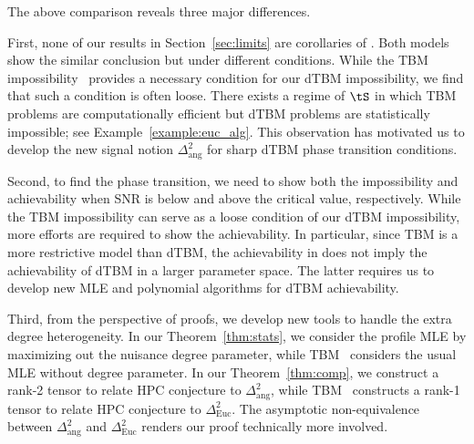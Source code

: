 \documentclass[lettersize,onecolumn,journal]{IEEEtran}
\theoremstyle{definition}
\theoremstyle{definition}
\begin{document}
{\begin{itemize}[wide]
The above comparison reveals three major differences. 

First, none of our results in Section~\ref{sec:limits} are corollaries of \cite{han2020exact}. Both models show the similar conclusion but under different conditions. While the TBM impossibility~\citep{han2020exact} provides a necessary condition for our dTBM impossibility, we find that such a condition is often loose. There exists a regime of $\tS$ in which TBM problems are computationally efficient but dTBM problems are statistically impossible; see Example~\ref{example:euc_alg}. This observation has motivated us to develop the new signal notion $\Delta^2_{\text{ang}}$ for sharp dTBM phase transition conditions.  
     
 Second, to find the phase transition, we need to show both the impossibility and achievability when SNR is below and above the critical value, respectively. While the TBM impossibility can serve as a loose condition of our dTBM impossibility, more efforts are required to show the achievability. In particular, since TBM is a more restrictive model than dTBM, the achievability in \cite{han2020exact} does not imply the achievability of dTBM in a larger parameter space. The latter requires us to develop new MLE and polynomial algorithms for dTBM achievability.  %
    
Third, from the perspective of proofs, we develop new tools to handle the extra degree heterogeneity. In our Theorem~\ref{thm:stats}, we consider the profile MLE by maximizing out the nuisance degree parameter, while TBM~\citep{han2020exact} considers the usual MLE without degree parameter. In our Theorem~\ref{thm:comp}, we construct a rank-2 tensor to relate HPC conjecture to $\Delta^2_{\text{ang}}$, while TBM~\citep{han2020exact} constructs a rank-1 tensor to relate HPC conjecture to $\Delta^2_{\text{Euc}}$. The asymptotic non-equivalence between $\Delta^2_{\text{ang}}$ and $\Delta^2_{\text{Euc}}$ renders our proof technically more involved.


\end{itemize}}
\end{document}
